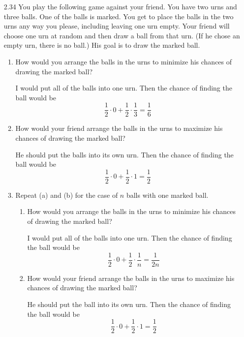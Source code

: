 \documentclass[10pt]{article}
\begin{document}
\begin{itemize}
\newpage
  \item[2.34] You play the following game against your friend. You have two urns and three balls. One of the balls is marked. You get to place the balls in the two urns any way you please, including leaving one urn empty. Your friend will choose one urn at random and then draw a ball from that urn. (If he chose an empty urn, there is no ball.) His goal is to draw the marked ball.

    \begin{enumerate}
      \item How would you arrange the balls in the urns to minimize his chances of drawing the marked ball?

        I would put all of the balls into one urn.  Then the chance of
        finding the ball would be
        \[ \frac{1}{2} \cdot 0 + \frac{1}{2} \cdot \frac{1}{3} = \frac{1}{6}  \]

      \item How would your friend arrange the balls in the urns to maximize his chances of drawing the marked ball?

        He should put the balls into its own urn.  Then the chance of
        finding the ball would be
        \[ \frac{1}{2} \cdot 0 + \frac{1}{2} \cdot 1 = \frac{1}{2}  \]

      \item Repeat (a) and (b) for the case of $n$ balls with one marked ball.
        \begin{enumerate}
          \item How would you arrange the balls in the urns to minimize
            his chances of drawing the marked ball?

            I would put all of the balls into one urn.  Then the chance of
            finding the ball would be
            \[ \frac{1}{2} \cdot 0 + \frac{1}{2} \cdot \frac{1}{n} =
            \frac{1}{2n}  \]

          \item How would your friend arrange the balls in the urns to
            maximize his chances of drawing the marked ball?

            He should put the ball into its own urn.  Then the chance of
            finding the ball would be
            \[ \frac{1}{2} \cdot 0 + \frac{1}{2} \cdot 1 = \frac{1}{2}  \]
        \end{enumerate}

    \end{enumerate}



\end{itemize}
\end{document}
